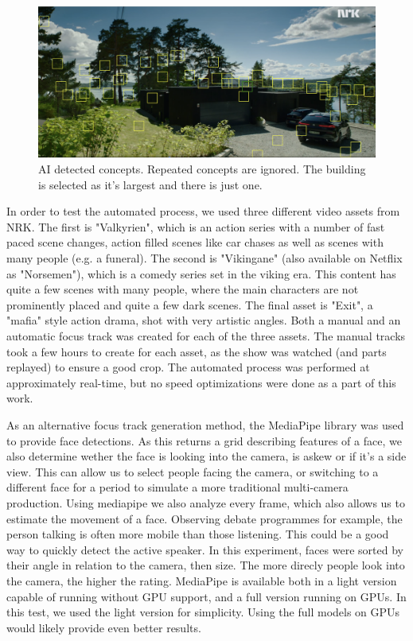 \documentclass{aircc}
\begin{document}
\begin{figure}
\begin{center}
\includegraphics[width=1.0\columnwidth]{track_stuff.png}
\caption{AI detected concepts. Repeated concepts are ignored. The building is
 selected as it's largest and there is just one.}
\label{fig_stuff_tracking}
\end{center}
\end{figure}
  
In order to test the automated process, we used three different video assets
from NRK. The first is "Valkyrien", which is an action series with a number
of fast paced scene changes, action filled scenes like car chases as well as
scenes with many people (e.g. a funeral). The second is "Vikingane"
(also available on Netflix as "Norsemen"), which is a comedy series set in
the viking era. This content has quite a few scenes with many people, where
the main characters are not prominently placed and quite a few dark scenes.
The final asset is "Exit", a "mafia" style action drama, shot with very
artistic angles. Both a manual and an automatic focus track was created for
each of the three assets. The manual tracks took a few hours to create for
each asset, as the show was watched (and parts replayed) to ensure a good
crop. The automated process was performed at approximately real-time, but no
speed optimizations were done as a part of this work.

As an alternative focus track generation method, the MediaPipe library\cite
{mediapipe} was used to provide face detections. As this returns a grid
describing features of a face, we also determine wether the face is looking
into the camera, is askew or if it's a side view. This can allow us to select
people facing the camera, or switching to a different face for a period to
simulate a more traditional multi-camera production. Using mediapipe we also
analyze every frame, which also allows us to estimate the movement of a face.
Observing debate programmes for example, the person talking is often more
mobile than those listening. This could be a good way to quickly detect the
active speaker. In this experiment, faces were sorted by their angle in
relation to the camera, then size. The more direcly people look into the
camera, the higher the rating. MediaPipe is available both in a light version
capable of running without GPU support, and a full version running on GPUs.
In this test, we used the light version for simplicity. Using the full models
on GPUs would likely provide even better results.
\end{document}
